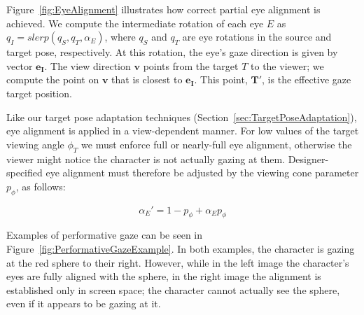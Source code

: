
Figure~\ref{fig:EyeAlignment} illustrates how correct partial eye alignment is achieved. We compute the intermediate rotation of each eye $E$ as $q_I = slerp ( q_S, q_T, \alpha_E )$, where $q_S$ and $q_T$ are eye rotations in the source and target pose, respectively. At this rotation, the eye's gaze direction is given by vector $\mathbf{e_I}$. The view direction $\mathbf{v}$ points from the target $T$ to the viewer; we compute the point on $\mathbf{v}$ that is closest to $\mathbf{e_I}$. This point, $\mathbf{T'}$, is the effective gaze target position.

Like our target pose adaptation techniques (Section~\ref{sec:TargetPoseAdaptation}), eye alignment is applied in a view-dependent manner. For low values of the target viewing angle $\phi_T$ we must enforce full or nearly-full eye alignment, otherwise the viewer might notice the character is not actually gazing at them. Designer-specified eye alignment must therefore be adjusted by the viewing cone parameter $p_{\phi}$, as follows:

\begin{equation}
\alpha_E' = 1 - p_{\phi} + \alpha_E p_{\phi}
\end{equation}

Examples of performative gaze can be seen in Figure~\ref{fig:PerformativeGazeExample}. In both examples, the character is gazing at the red sphere to their right. However, while in the left image the character's eyes are fully aligned with the sphere, in the right image the alignment is established only in screen space; the character cannot actually see the sphere, even if it appears to be gazing at it.
